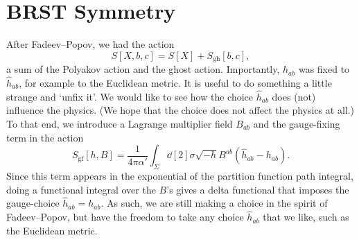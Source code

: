 \section{BRST Symmetry}%
\label{sec:brst_symmetry}

After Fadeev--Popov, we had the action
\begin{equation}
  S[X, b, c] = S[X] + S_{\text{gh}}[b, c],
\end{equation}
a sum of the Polyakov action and the ghost action.
Importantly, $h_{ab}$ was fixed to $\hat{h}_{ab}$, for example to the Euclidean metric.
It is useful to do something a little strange and `unfix it'.
We would like to see how the choice $\hat{h}_{ab}$ does (not) influence the physics. (We hope that the choice does not affect the physics at all.)
To that end, we introduce a Lagrange multiplier field $B_{ab}$ and the gauge-fixing term in the action
\begin{equation}
  \label{eq:sgf}
  S_{\text{gf}}[h, B] = \frac{1}{4 \pi \alpha'} \int_{\Sigma} \dd[2]{\sigma} \sqrt{-h} B^{ab} (\hat{h}_{ab} - h_{ab}).
\end{equation}
Since this term appears in the exponential of the partition function path integral, doing a functional integral over the $B$'s gives a delta functional that imposes the gauge-choice $\hat{h}_{ab} = h_{ab}$.
As such, we are still making a choice in the spirit of Fadeev--Popov, but have the freedom to take any choice $\hat{h}_{ab}$ that we like, such as the Euclidean metric.
